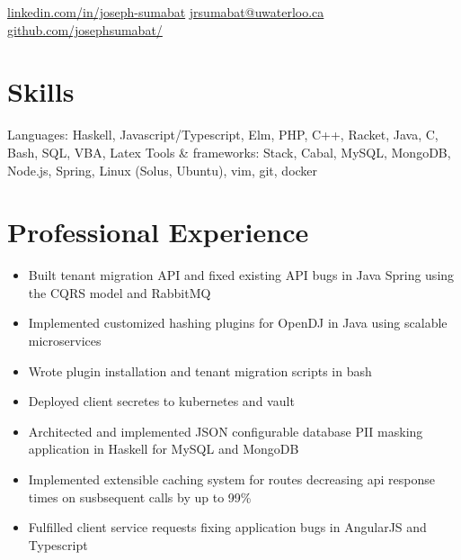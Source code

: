 \documentclass{simple_resume}
\begin{document}
{\href{https://www.linkedin.com/in/joseph-sumabat}{linkedin.com/in/joseph-sumabat}}
{\href{to:jrsumabat@uwaterloo.ca}{jrsumabat@uwaterloo.ca}}
{\href{https://github.com/josephsumabat/}{github.com/josephsumabat/}}

\section{Skills}
\resskillheading
    {Languages:}
    {Haskell, Javascript/Typescript, Elm, PHP, C++, Racket, Java, C, Bash, SQL, VBA, Latex}
    \resskillheading
    {Tools \& frameworks:}
    {Stack, Cabal, MySQL, MongoDB, Node.js, Spring, Linux (Solus, Ubuntu), vim, git, docker}

\section{Professional Experience}
\begin{itemize}
  \item Built tenant migration API and fixed existing API bugs in Java Spring using the CQRS model and RabbitMQ
  \item Implemented customized hashing plugins for OpenDJ in Java using scalable microservices
  \item Wrote plugin installation and tenant migration scripts in bash
  \item Deployed client secretes to kubernetes and vault
\end{itemize}

\begin{itemize}
  \item{Architected and implemented JSON configurable database PII masking application in Haskell for MySQL and MongoDB}
  \item{Implemented extensible caching system for routes decreasing api response times on susbsequent calls by up to 99\%}
  \item{Fulfilled client service requests fixing application bugs in AngularJS and Typescript}
\end{itemize}
\end{document}
